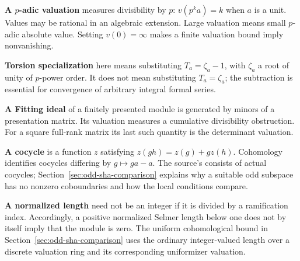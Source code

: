 \documentclass[11pt,letterpaper]{article}
\theoremstyle{remark}
\begin{document}
\textbf{A $p$-adic valuation} measures divisibility by $p$: $v(p^ka)=k$
when $a$ is a unit. Values may be rational in an algebraic extension.
Large valuation means small $p$-adic absolute value. Setting $v(0)=\infty$
makes a finite valuation bound imply nonvanishing.

\textbf{Torsion specialization} here means substituting
$T_a=\zeta_a-1$, with $\zeta_a$ a root of unity of $p$-power order. It
does not mean substituting $T_a=\zeta_a$; the subtraction is essential for
convergence of arbitrary integral formal series.

\textbf{A Fitting ideal} of a finitely presented module is generated by
minors of a presentation matrix. Its valuation measures a cumulative
divisibility obstruction. For a square full-rank matrix its last such
quantity is the determinant valuation.

\textbf{A cocycle} is a function $z$ satisfying
$z(gh)=z(g)+g z(h)$. Cohomology identifies cocycles differing by
$g\mapsto ga-a$. The source's  consists of actual cocycles;
Section~\ref{sec:odd-sha-comparison} explains why a suitable odd subspace
has no nonzero coboundaries and how the local conditions compare.

\textbf{A normalized length} need not be an integer if it is divided by a
ramification index. Accordingly, a positive normalized Selmer length below
one does not by itself imply that the module is zero. The uniform
cohomological bound in Section~\ref{sec:odd-sha-comparison} uses the ordinary
integer-valued length over a discrete valuation ring and its corresponding
uniformizer valuation.
\end{document}
